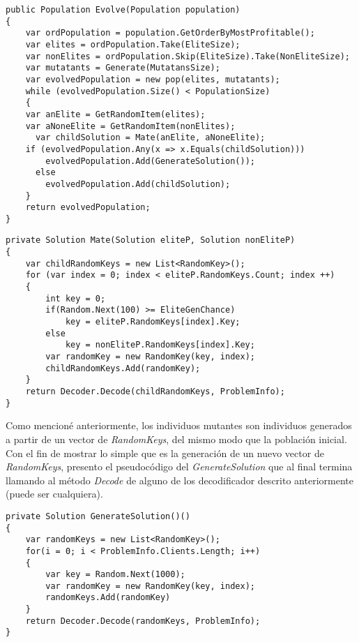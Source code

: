 \bigskip

\begin{minipage}{\textwidth}
\begin{lstlisting}
public Population Evolve(Population population)
{
    var ordPopulation = population.GetOrderByMostProfitable();
    var elites = ordPopulation.Take(EliteSize);
    var nonElites = ordPopulation.Skip(EliteSize).Take(NonEliteSize);
    var mutatants = Generate(MutatansSize);
    var evolvedPopulation = new pop(elites, mutatants);
    while (evolvedPopulation.Size() < PopulationSize)
    {
	var anElite = GetRandomItem(elites);
	var aNoneElite = GetRandomItem(nonElites);
      var childSolution = Mate(anElite, aNoneElite);
	if (evolvedPopulation.Any(x => x.Equals(childSolution)))
		evolvedPopulation.Add(GenerateSolution());
      else
		evolvedPopulation.Add(childSolution);
    }
    return evolvedPopulation;
}
\end{lstlisting}
\end{minipage}

\begin{minipage}{\textwidth}
\begin{lstlisting}
private Solution Mate(Solution eliteP, Solution nonEliteP)
{
	var childRandomKeys = new List<RandomKey>();
	for (var index = 0; index < eliteP.RandomKeys.Count; index ++)
	{
		int key = 0;
		if(Random.Next(100) >= EliteGenChance)
			key = eliteP.RandomKeys[index].Key;
		else
			key = nonEliteP.RandomKeys[index].Key;
		var randomKey = new RandomKey(key, index);
		childRandomKeys.Add(randomKey);
	}
	return Decoder.Decode(childRandomKeys, ProblemInfo);
}
\end{lstlisting}
\end{minipage}

\bigskip

Como mencioné anteriormente, los individuos mutantes son individuos generados a partir de un vector de \textit{RandomKeys}, del mismo modo que la población inicial. Con el fin de mostrar lo simple que es la generación de un nuevo vector de \textit{RandomKeys}, presento el pseudocódigo del \textit{GenerateSolution} que al final termina llamando al método \textit{Decode} de alguno de los decodificador descrito anteriormente (puede ser cualquiera).

\bigskip

\begin{minipage}{\textwidth}
\begin{lstlisting}
private Solution GenerateSolution()()
{
	var randomKeys = new List<RandomKey>();
	for(i = 0; i < ProblemInfo.Clients.Length; i++)
	{
		var key = Random.Next(1000);
		var randomKey = new RandomKey(key, index);
		randomKeys.Add(randomKey)
	}
	return Decoder.Decode(randomKeys, ProblemInfo);
}
\end{lstlisting}
\end{minipage}

